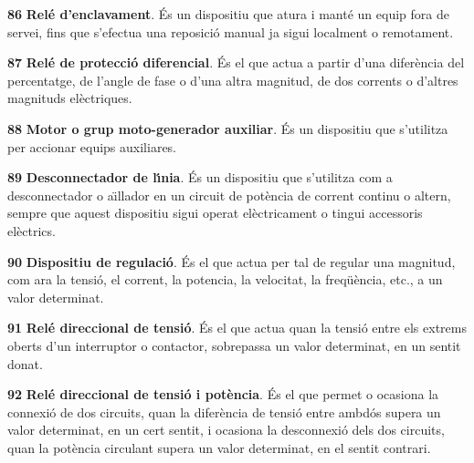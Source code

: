 \begin{multicols}{2}
\begin{list}{}
\item[\textbf{86}]   
\textbf{Rel\'{e} d'enclavament}. \'{E}s un dispositiu que atura i mant\'{e} un equip fora de servei, fins que s'efectua una reposici\'{o} manual ja sigui localment o remotament.

\item[\textbf{87}]   
\textbf{Rel\'{e} de protecci\'{o}
diferencial}. \'{E}s el que actua a partir d'una difer\`{e}ncia  del percentatge, de l'angle de fase o d'una altra magnitud, de dos corrents
o d'altres magnituds el\`{e}ctriques.

\item[\textbf{88}]  
 \textbf{Motor o grup
moto-generador auxiliar}. \'{E}s un dispositiu que s'utilitza per
accionar equips auxiliares.

\item[\textbf{89}]  
 \textbf{Desconnectador de l\'{\i}nia}. \'{E}s
un dispositiu que s'utilitza com a desconnectador o a\"{\i}llador en un
circuit de pot\`{e}ncia de corrent continu o altern, sempre que aquest
dispositiu sigui operat el\`{e}ctricament o tingui accessoris el\`{e}ctrics.

\item[\textbf{90}]   
\textbf{Dispositiu de regulaci\'{o}}. \'{E}s el que
actua per tal de regular una magnitud, com ara la tensi\'{o}, el corrent, la potencia,
la velocitat, la freq\"{u}\`{e}ncia, etc., a un valor determinat.

\item[\textbf{91}]   
\textbf{Rel\'{e} direccional de tensi\'{o}}.
\'{E}s el que actua quan la tensi\'{o} entre els extrems oberts d'un
interruptor o contactor, sobrepassa un valor determinat, en un
sentit donat.

\item[\textbf{92}]   
\textbf{Rel\'{e} direccional
de tensi\'{o} i pot\`{e}ncia}. \'{E}s el que permet o ocasiona la connexi\'{o} de
dos circuits, quan la difer\`{e}ncia de tensi\'{o} entre ambd\'{o}s supera un
valor determinat, en un cert sentit, i ocasiona la desconnexi\'{o} dels
dos circuits, quan la pot\`{e}ncia circulant supera un valor determinat,
en el sentit contrari.


\end{list}
\end{multicols}
